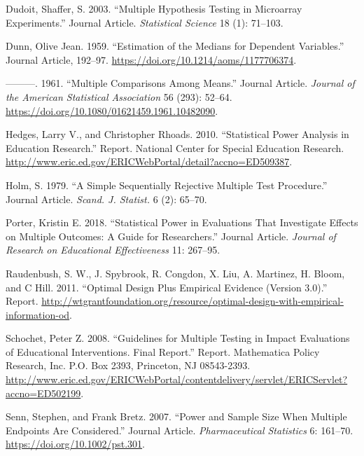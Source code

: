 \documentclass[
]{article}
\newlength{\cslhangindent}
\newlength{\cslentryspacingunit} %
\newenvironment{CSLReferences}[2] %
 {%
  \setlength{\parindent}{0pt}
  \ifodd #1
  \let\oldpar\par
  \def\par{\hangindent=\cslhangindent\oldpar}
  \fi
  \setlength{\parskip}{#2\cslentryspacingunit}
 }%
 {}
\begin{document}
\begin{CSLReferences}{1}{0}
\leavevmode{}%
Dudoit, Shaffer, S. 2003. {``Multiple Hypothesis Testing in Microarray
Experiments.''} Journal Article. \emph{Statistical Science} 18 (1):
71--103.

\leavevmode{}%
Dunn, Olive Jean. 1959. {``Estimation of the Medians for Dependent
Variables.''} Journal Article, 192--97.
\url{https://doi.org/10.1214/aoms/1177706374}.

\leavevmode{}%
---------. 1961. {``Multiple Comparisons Among Means.''} Journal
Article. \emph{Journal of the American Statistical Association} 56
(293): 52--64. \url{https://doi.org/10.1080/01621459.1961.10482090}.

\leavevmode{}%
Hedges, Larry V., and Christopher Rhoads. 2010. {``Statistical Power
Analysis in Education Research.''} Report. National Center for Special
Education Research.
\url{http://www.eric.ed.gov/ERICWebPortal/detail?accno=ED509387}.

\leavevmode{}%
Holm, S. 1979. {``A Simple Sequentially Rejective Multiple Test
Procedure.''} Journal Article. \emph{Scand. J. Statist.} 6 (2): 65--70.

\leavevmode{}%
Porter, Kristin E. 2018. {``Statistical Power in Evaluations That
Investigate Effects on Multiple Outcomes: A Guide for Researchers.''}
Journal Article. \emph{Journal of Research on Educational Effectiveness}
11: 267--95.

\leavevmode{}%
Raudenbush, S. W., J. Spybrook, R. Congdon, X. Liu, A. Martinez, H.
Bloom, and C Hill. 2011. {``Optimal Design Plus Empirical Evidence
(Version 3.0).''} Report.
\url{http://wtgrantfoundation.org/resource/optimal-design-with-empirical-information-od}.

\leavevmode{}%
Schochet, Peter Z. 2008. {``Guidelines for Multiple Testing in Impact
Evaluations of Educational Interventions. Final Report.''} Report.
Mathematica Policy Research, Inc. P.O. Box 2393, Princeton, NJ
08543-2393.
\url{http://www.eric.ed.gov/ERICWebPortal/contentdelivery/servlet/ERICServlet?accno=ED502199}.

\leavevmode{}%
Senn, Stephen, and Frank Bretz. 2007. {``Power and Sample Size When
Multiple Endpoints Are Considered.''} Journal Article.
\emph{Pharmaceutical Statistics} 6: 161--70.
\url{https://doi.org/10.1002/pst.301}.


\end{CSLReferences}
\end{document}
